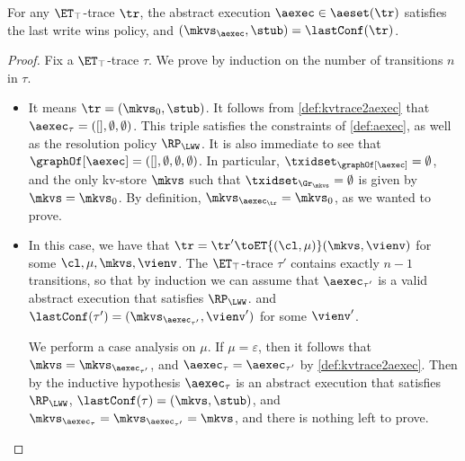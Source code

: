 \begin{proposition}
\label{prop:kvtrace2aexec}
For any $\ET_{\top}$-trace $\tr$, 
the abstract execution $\aexec \in \aeset(\tr)$ satisfies the last write wins policy,
and $(\mkvs_{\aexec}, \stub) = \lastConf(\tr)$.
\end{proposition}
\begin{proof}
Fix a $\ET_{\top}$-trace $\tau$. 
We prove by induction on the number of transitions $n$ in $\tau$. 
\begin{itemize}
\item {}
It means $\tr = (\mkvs_{0}, \stub)$.
It follows from \cref{def:kvtrace2aexec} that $\aexec_{\tau} = ([], \emptyset, \emptyset)$. 
This triple satisfies the constraints of \cref{def:aexec}, as well as the resolution policy $\RP_{\LWW}$. 
It is also immediate to see that $\graphOf[\aexec] = ([], \emptyset, \emptyset, \emptyset)$.
In particular, $\txidset_{\graphOf[\aexec]} = \emptyset$, 
and the only kv-store $\mkvs$ such that $\txidset_{\Gr_{\mkvs}} = \emptyset$ 
is given by $\mkvs = \mkvs_{0}$. 
By definition, $\mkvs_{\aexec_{\tr}} = \mkvs_{0}$, as we wanted to prove.

\item {} In this case, we have that $\tr = \tr' \toET{(\cl, \mu)} (\mkvs, \vienv)$ 
for some $\cl, \mu, \mkvs, \vienv$. The $\ET_{\top}$-trace $\tau'$ contains exactly $n-1$ transitions, 
so that by induction we can assume that $\aexec_{\tau'}$ is a valid abstract execution that satisfies 
$\RP_{\LWW}$. and $\lastConf(\tau') = (\mkvs_{\aexec_{\tau'}}, \vienv')$ for some $\vienv'$. 

We perform a case analysis on $\mu$. 
If $\mu = \varepsilon$, then it follows that $\mkvs = \mkvs_{\aexec_{\tau'}}$, 
and $\aexec_{\tau} = \aexec_{\tau'}$ by \cref{def:kvtrace2aexec}. 
Then by the inductive hypothesis $\aexec_{\tau}$ is an abstract execution that satisfies $\RP_{\LWW}$,
$\lastConf(\tau) = (\mkvs, \stub)$, and $\mkvs_{\aexec_{\tau}} = \mkvs_{\aexec_{\tau'}} = \mkvs$, 
and there is nothing left to prove. 


\end{itemize}
\end{proof}
